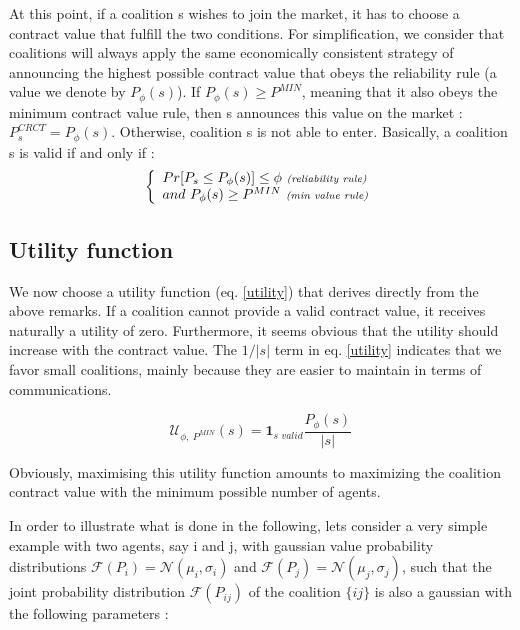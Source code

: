 \documentclass[conference]{IEEEtran}
\begin{document}
At this point, if a coalition s wishes to join the market, it has to choose a contract value that fulfill the two conditions. For simplification, we consider that coalitions will always apply the same economically consistent strategy of announcing the highest possible contract value that obeys the reliability rule (a value we denote by $ P_{\phi}(s) $). If $ P_{\phi}(s) \geq P^{MIN} $, meaning that it also obeys the minimum contract value rule, then s announces this value on the market : $ P_{s}^{CRCT} = P_{\phi}(s) $. Otherwise, coalition s is not able to enter.
Basically, a coalition s is valid if and only if :
\begin{equation}
\left\{ \begin{array}{lll}
		Pr[ P_{s} \leq P_{\phi}(s)] \leq \phi\ \textit{{\scriptsize (reliability rule)}} \\
		and\ P_{\phi}(s) \geq P^{MIN}\ \textit{{\scriptsize (min value rule)}}

\end{array} \right. 
\label{rules}
\end{equation}

\subsection{Utility function}\label{subsec:UtilityFunc}
We now choose a utility function (eq. \ref{utility}) that derives directly from the above remarks. If a coalition cannot provide a valid contract value, it receives naturally a utility of zero. Furthermore, it seems obvious that the utility should increase with the contract value. The $ 1/|s| $ term in eq. \ref{utility} indicates that we favor small coalitions, mainly because they are easier to maintain in terms of communications.

\begin{equation}
 \mathcal{U}_{\phi,\ P^{MIN}}(s) = \mathbf{1}_{\textit{s\ valid}} \dfrac{P_{\phi}(s)}{|s|} 
\label{utility}
\end{equation}

Obviously, maximising this utility function amounts to maximizing the coalition contract value with the minimum possible number of agents. 

In order to illustrate what is done in the following, lets consider a very simple example with two agents, say i and j, with gaussian value probability distributions $ \mathcal{F}(P_{i}) = \mathcal{N}(\mu_{i}, \sigma_{i}) $ and $ \mathcal{F}(P_{j}) = \mathcal{N}(\mu_{j}, \sigma_{j}) $, such that the joint probability distribution  $ \mathcal{F}(P_{ij}) $ of the coalition $\{ij\}$ is also a gaussian with the following parameters :
\end{document}
